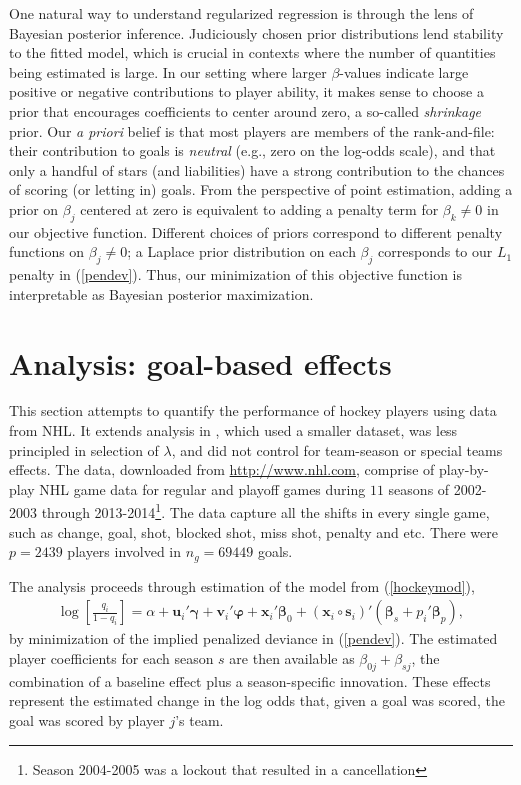 One natural way to understand regularized regression is through the lens of
Bayesian posterior inference. Judiciously chosen prior distributions lend
stability to the fitted model, which is crucial in contexts where the number
of quantities being estimated is large. In our setting where larger
$\beta$-values indicate large positive or negative contributions to player
ability, it makes sense to choose a prior that encourages coefficients to
center around zero, a so-called {\em shrinkage} prior.  Our {\em a priori}
belief is that most players are members of the rank-and-file: their
contribution to goals is {\em neutral} (e.g., zero on the log-odds scale), and
that only a handful of stars (and liabilities) have a strong contribution to
the chances of scoring (or letting in) goals.  From the perspective of point
estimation, adding a prior on $\beta_j$ centered at zero is equivalent to
adding a penalty term for $\beta_k \ne 0$ in our objective function. Different
choices of priors correspond to different penalty functions on $\beta_j \ne
0$; a Laplace prior distribution on each $\beta_j$  corresponds to our $L_1$
penalty in (\ref{pendev}).  Thus, our minimization of this objective function
is interpretable as Bayesian posterior maximization.

\section{Analysis: goal-based effects}
\label{sec:goals}



This section attempts to quantify the performance of hockey players using data
from NHL. It extends  analysis in
\cite{gramacy:jensen:taddy:2013}, which used a smaller dataset, was less
principled in selection of $\lambda$, and did not control for team-season or
special teams effects. The data, downloaded from \url{http://www.nhl.com},
comprise of play-by-play NHL game data for regular and playoff games during
$11$ seasons of 2002-2003 through 2013-2014\footnote{Season 2004-2005 was a
lockout that resulted in a cancellation}. The data capture all the shifts in
every single game, such as change, goal, shot, blocked shot, miss shot,
penalty and etc. There were $p=2439$ players involved in $n_g=69449$ goals.

The analysis proceeds through estimation of the model from (\ref{hockeymod}),
\begin{align*}
\log\left[\frac{q_{i}}{1-q_{i}}\right] = \alpha + \mathbf{u}_i'\boldsymbol{\gamma} +
\mathbf{v}_i'\boldsymbol{\varphi} + \mathbf{x}_i'\boldsymbol{\beta}_0 +
(\mathbf{x}_i\circ\mathbf{s}_i)'(\boldsymbol{\beta}_s +
p_i'\boldsymbol{\beta}_{p}), \end{align*} by minimization of the implied
penalized deviance in (\ref{pendev}). The estimated player coefficients for
each season $s$ are then available as $\beta_{0j} + \beta_{sj}$,  the
combination of a  baseline effect plus a season-specific innovation.  These
effects represent the estimated change in the log odds that, given a goal was
scored, the goal was scored by player $j$'s team.

